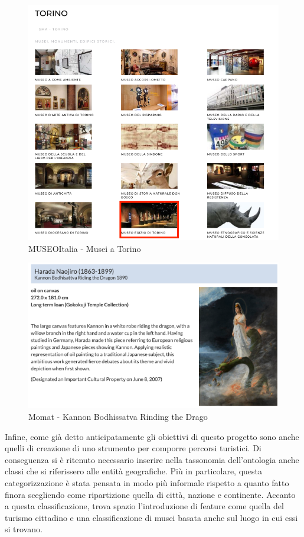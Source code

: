 \documentclass[12pt]{article}
\begin{document}
\begin{figure}[!h]
   \centering
   \includegraphics[scale=0.5]{fig/opera di MuseiITALIA.png}
   \caption{MUSEOItalia - Musei a Torino}\label{fig:picture}
\end{figure}
\begin{figure}[!h]
   \centering
   \includegraphics[scale=0.5]{fig/opera del Momat.png}
   \caption{Momat - Kannon Bodhissatva Rinding the Drago}\label{fig:picture}
\end{figure}

Infine, come già detto anticipatamente gli obiettivi di questo progetto sono anche quelli di creazione di uno strumento per comporre percorsi turistici. Di conseguenza si è ritenuto necessario inserire nella tassonomia dell’ontologia anche classi che si riferissero alle entità geografiche. Più in particolare, questa categorizzazione è stata pensata in modo più informale rispetto a quanto fatto finora scegliendo come ripartizione quella di città, nazione e continente. Accanto a questa classificazione, trova spazio l’introduzione di feature come quella del turismo cittadino e una classificazione di musei basata anche sul luogo in cui essi si trovano.
\end{document}
